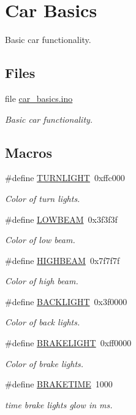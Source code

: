 \hypertarget{group__car}{}\section{Car Basics}
\label{group__car}


Basic car functionality.  


\subsection*{Files}
\begin{DoxyCompactItemize}
\item 
file \hyperlink{car__basics_8ino}{car\+\_\+basics.\+ino}
\begin{DoxyCompactList}\small\item\em Basic car functionality. \end{DoxyCompactList}\end{DoxyCompactItemize}
\subsection*{Macros}
\begin{DoxyCompactItemize}
\item 
\#define \hyperlink{group__car_ga6670c8646da7675376960bb5773199fd}{T\+U\+R\+N\+L\+I\+G\+HT}~0xffc000
\begin{DoxyCompactList}\small\item\em Color of turn lights. \end{DoxyCompactList}\item 
\#define \hyperlink{group__car_ga61bb8d5dab460079c1b621b2d8a4bd9c}{L\+O\+W\+B\+E\+AM}~0x3f3f3f
\begin{DoxyCompactList}\small\item\em Color of low beam. \end{DoxyCompactList}\item 
\#define \hyperlink{group__car_ga3f561f12573270e4b5329bc5930ad20f}{H\+I\+G\+H\+B\+E\+AM}~0x7f7f7f
\begin{DoxyCompactList}\small\item\em Color of high beam. \end{DoxyCompactList}\item 
\#define \hyperlink{group__car_gae97ccf06dd29b2a0500f378068b678e2}{B\+A\+C\+K\+L\+I\+G\+HT}~0x3f0000
\begin{DoxyCompactList}\small\item\em Color of back lights. \end{DoxyCompactList}\item 
\#define \hyperlink{group__car_ga95743a8e9ccb3be5a627dd9322806751}{B\+R\+A\+K\+E\+L\+I\+G\+HT}~0xff0000
\begin{DoxyCompactList}\small\item\em Color of brake lights. \end{DoxyCompactList}\item 
\#define \hyperlink{group__car_gadbd34b4269ed16bd87a0d13cb17bdf81}{B\+R\+A\+K\+E\+T\+I\+ME}~1000
\begin{DoxyCompactList}\small\item\em time brake lights glow in ms. \end{DoxyCompactList}\end{DoxyCompactItemize}
